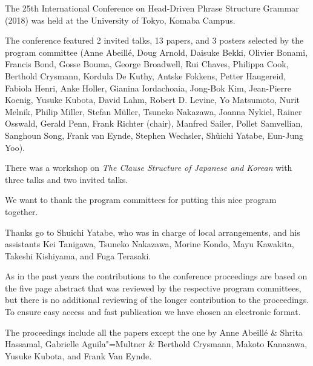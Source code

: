 The 25th International Conference on Head-Driven Phrase Structure Grammar (2018) was held at
the University of Tokyo, Komaba Campus.

The conference featured 2 invited talks, 13 papers, and 3 posters selected by the program committee 
(Anne Abeillé,
Doug Arnold,
Daisuke Bekki,
Olivier Bonami,
Francis Bond,
Gosse Bouma,
George Broadwell,
Rui Chaves,
Philippa Cook,
Berthold Crysmann,
Kordula De Kuthy,
Antske Fokkens,
Petter Haugereid,
Fabiola Henri,
Anke Holler,
Gianina Iordachoaia,
Jong-Bok Kim,
Jean-Pierre Koe\-nig,
Yusuke Kubota,
David Lahm,
Robert D. Levine,
Yo Matsumoto,
Nurit Melnik,
Philip Miller,
Stefan Müller,
Tsuneko Nakazawa,
Joanna Nykiel,
Rainer Osswald,
Gerald Penn,
Frank Richter (chair),
Manfred Sailer,
Pollet Samvellian,
Sanghoun Song,
Frank van Eynde,
Stephen Wechsler,
Shûichi Yatabe,
Eun-Jung Yoo).

There was a workshop on \emph{The Clause Structure of Japanese and Korean} with three talks and two
invited talks.

We want to thank the program committees for putting this nice program together.

Thanks go to Shuichi Yatabe, who was in charge of local arrangements, and his assistants Kei Tanigawa,
Tsuneko Nakazawa,
Morine Kondo,
Mayu Kawakita,
Takeshi Kishiyama, and
Fuga Terasaki.
 

As in the past years the contributions to the conference proceedings are based on the five page abstract
that was reviewed by the respective program committees, but there is no additional reviewing of the
longer contribution to the proceedings.
To ensure easy access and fast publication we have chosen an electronic format.

The proceedings include all the papers except the one by Anne Abeillé \& Shrita Hassamal, Gabrielle Aguila"=Multner \&
Berthold Crysmann, Makoto Kanazawa, Yusuke Kubota, and Frank Van Eynde. 


